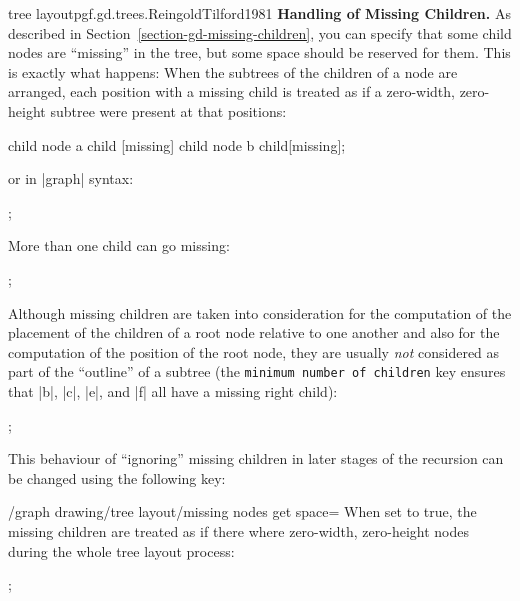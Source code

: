 \begin{gdalgorithm}{tree layout}{pgf.gd.trees.ReingoldTilford1981}
  \noindent\textbf{Handling of Missing Children.}
  As described in Section~\ref{section-gd-missing-children}, you can
  specify that some child nodes are ``missing'' in the tree, but some
  space should be reserved for them. This is exactly what happens:
  When the subtrees of the children of a node are arranged, each
  position with a missing child is treated as if a zero-width,
  zero-height subtree were present at that positions:
\begin{codeexample}[]
\tikz [tree layout, nodes={draw,circle}]
  child { node {a}
    child [missing]
    child { node {b} }
  }
  child[missing];
\end{codeexample}
  or in |graph| syntax:
\begin{codeexample}[]
\tikz {};
\end{codeexample}
  More than one child can go missing:
\begin{codeexample}[]
\tikz {};
\end{codeexample}
  Although missing children are taken into consideration for the
  computation of the placement of the children of a root node relative
  to one another and also for the computation of the position of the
  root node, they are usually \emph{not} considered as part of the
  ``outline'' of a subtree (the \texttt{minimum number of children}
  key ensures that |b|, |c|, |e|, and |f| all have a missing right
  child): 
\begin{codeexample}[]
\tikz {};
\end{codeexample}
  This behaviour of ``ignoring'' missing children in later stages of
  the recursion can be changed using the following key:
  \begin{key}{/graph drawing/tree layout/missing nodes get
      space=}
    When set to true, the missing children are treated as if there
    where zero-width, zero-height nodes during the whole tree layout
    process: 
\begin{codeexample}[]
\tikz {};
\end{codeexample}
  \end{key}
  

\end{gdalgorithm}
